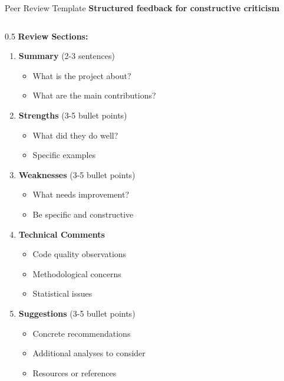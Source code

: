 
\begin{frame}[fragile]{Peer Review Template}
\textbf{Structured feedback for constructive criticism}

\begin{columns}
\begin{column}{0.5\textwidth}
\textbf{Review Sections:}

\begin{enumerate}
\item \textbf{Summary} (2-3 sentences)
   \begin{itemize}
   \item What is the project about?
   \item What are the main contributions?
   \end{itemize}

\item \textbf{Strengths} (3-5 bullet points)
   \begin{itemize}
   \item What did they do well?
   \item Specific examples
   \end{itemize}

\item \textbf{Weaknesses} (3-5 bullet points)
   \begin{itemize}
   \item What needs improvement?
   \item Be specific and constructive
   \end{itemize}

\item \textbf{Technical Comments}
   \begin{itemize}
   \item Code quality observations
   \item Methodological concerns
   \item Statistical issues
   \end{itemize}

\item \textbf{Suggestions} (3-5 bullet points)
   \begin{itemize}
   \item Concrete recommendations
   \item Additional analyses to consider
   \item Resources or references
   \end{itemize}


\end{enumerate}
\end{column}
\end{columns}
\end{frame}
